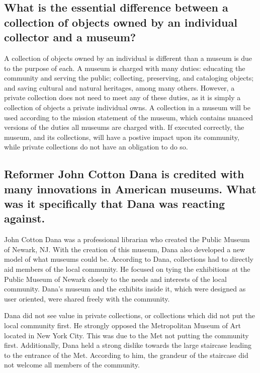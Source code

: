 \documentclass[11pt]{article}
\begin{document}
\begin{singlespacing}
\subsection*{What is the essential difference between a collection of objects owned by an individual collector and a museum?}
\end{singlespacing}

A collection of objects owned by an individual is different than a museum is due to the purpose of each. A museum is charged with many duties: educating the community and serving the public; collecting, preserving, and cataloging objects; and saving cultural and natural heritages, among many others. However, a private collection does not need to meet any of these duties, as it is simply a collection of objects a private individual owns. A collection in a museum will be used according to the mission statement of the museum, which contains nuanced versions of the duties all museums are charged with. If executed correctly, the museum, and its collections, will have a postive impact upon its community, while private collections do not have an obligation to do so.

\begin{singlespacing}
\subsection*{Reformer John Cotton Dana is credited with many innovations in American museums. What was it specifically that Dana was reacting against.}
\end{singlespacing}

John Cotton Dana was a professional librarian who created the Public Museum of Newark, NJ. With the creation of this museum, Dana also developed a new model of what museums could be. According to Dana, collections had to directly aid members of the local community. He focused on tying the exhibitions at the Public Museum of Newark closely to the needs and interests of the local community. Dana's museum and the exhibits inside it, which were designed as user oriented, were shared freely with the community.

Dana did not see value in private collections, or collections which did not put the local community first. He strongly opposed the Metropolitan Museum of Art located in New York City. This was due to the Met not putting the community first. Additionally, Dana held a strong dislike towards the large staircase leading to the entrance of the Met. According to him, the grandeur of the staircase did not welcome all members of the community.
\end{document}
